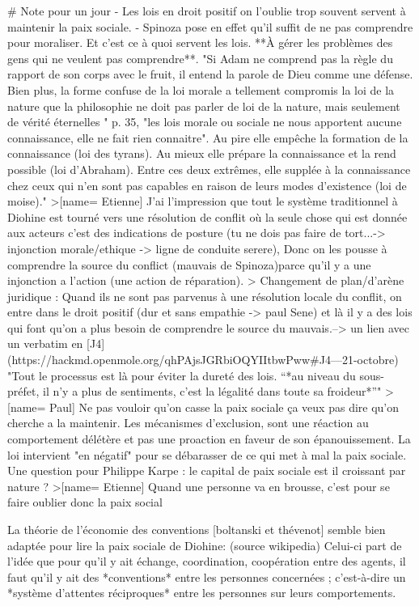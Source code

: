 # Note pour un jour
 - Les lois en droit positif on l'oublie trop souvent servent à maintenir la paix sociale.
 - Spinoza pose en effet qu'il suffit de ne pas comprendre pour moraliser. Et c'est ce à quoi servent les lois. **À gérer les problèmes des gens qui ne veulent pas comprendre**. "Si Adam ne comprend pas la règle du rapport de son corps avec le fruit, il entend la parole de Dieu comme une défense. Bien plus, la forme confuse de la loi morale a tellement compromis la loi de la nature que la philosophie ne doit pas parler de loi de la nature, mais seulement de vérité éternelles "  p. 35, "les lois morale ou sociale ne nous apportent aucune connaissance, elle ne fait rien connaitre". Au pire elle empêche la formation de la connaissance (loi des tyrans). Au mieux elle prépare la connaissance et la rend possible (loi d'Abraham). Entre ces deux extrêmes, elle supplée à la connaissance chez ceux qui n'en sont pas capables en raison de leurs modes d'existence (loi de moise)."
>[name= Etienne] J'ai l'impression que tout le système traditionnel à Diohine est tourné vers une résolution de conflit où la seule chose qui est donnée aux acteurs c'est des indications de posture (tu ne dois pas faire de tort...-> injonction morale/ethique -> ligne de conduite serere), Donc on les pousse à comprendre la source du conflict (mauvais de Spinoza)parce qu'il y a une injonction a l'action (une action de réparation). 
>
 Changement de plan/d'arène juridique : Quand ils ne sont pas parvenus à une résolution locale du conflit, on entre dans le droit positif (dur et sans empathie -> paul Sene) et là il y a des lois qui font qu'on a plus besoin de comprendre le source du mauvais.--> un lien avec un verbatim en [J4](https://hackmd.openmole.org/qhPAjsJGRbiOQYIItbwPww#J4---21-octobre) "Tout le processus est là pour éviter la dureté des lois. “*au niveau du sous-préfet, il n’y a plus de sentiments, c’est la légalité dans toute sa froideur*”"
>[name= Paul] Ne pas vouloir qu'on casse la paix sociale ça veux pas dire qu'on cherche a la maintenir. Les mécanismes d'exclusion, sont une réaction au comportement délétère et pas une proaction en faveur de son épanouissement. La loi intervient "en négatif" pour se débarasser de ce qui met à mal la paix sociale. Une question pour Philippe Karpe : le capital de paix sociale est il croissant par nature ? 
>[name= Etienne] Quand une personne va en brousse, c'est pour se faire oublier donc la paix social


La théorie de l'économie des conventions [boltanski et thévenot]  semble bien adaptée pour lire la paix sociale de Diohine: (source wikipedia) Celui-ci part de l'idée que pour qu'il y ait échange, coordination, coopération entre des agents, il faut qu'il y ait des *conventions* entre les personnes concernées ; c’est-à-dire un *système d'attentes réciproques* entre les personnes sur leurs comportements.


